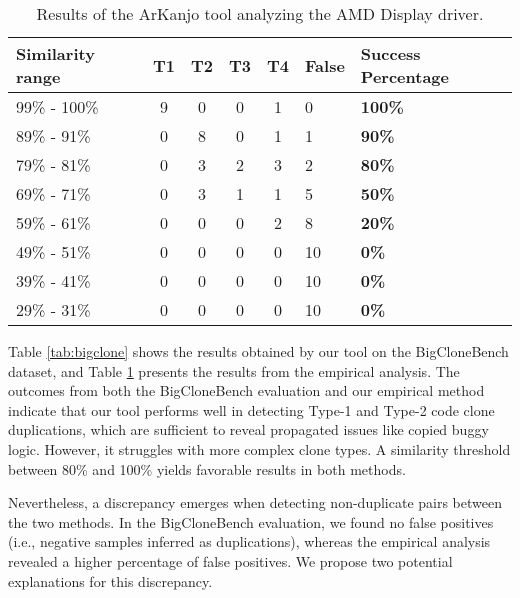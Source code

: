 \documentclass[conference]{IEEEtran}
\begin{document}
\begin{table}[!t]

\centering
\caption{Results of the ArKanjo tool analyzing the AMD Display driver.}
\begin{tabular}{ | m{15mm} | c | c | c | c | m{6mm} | m{10mm} | }

\hline

\textbf{Similarity range} & \textbf{T1} & \textbf{T2} & T3 & T4
& \textbf{False} & \textbf{Success Percentage} \\ \hline
99\% - 100\% & 9 & 0 & 0 & 1 & 0 & \textbf{100\%} \\ \hline
89\% - 91\% & 0 & 8 & 0 & 1 & 1 & \textbf{90\%} \\ \hline
79\% - 81\% & 0 & 3 & 2 & 3 & 2 & \textbf{80\%} \\ \hline
69\% - 71\% & 0 & 3 & 1 & 1 & 5 & \textbf{50\%} \\ \hline
59\% - 61\% & 0 & 0 & 0 & 2 & 8 & \textbf{20\%} \\ \hline
49\% - 51\% & 0 & 0 & 0 & 0 & 10 & \textbf{0\%} \\ \hline
39\% - 41\% & 0 & 0 & 0 & 0 & 10 & \textbf{0\%} \\ \hline
29\% - 31\% & 0 & 0 & 0 & 0 & 10 & \textbf{0\%} \\ \hline

\hline

\end{tabular}

\label{tab:emp}

\end{table}

Table \ref{tab:bigclone} shows the results obtained by our tool on the BigCloneBench dataset,
and Table \ref{tab:emp} presents the results from the empirical analysis.
The outcomes from both the BigCloneBench evaluation and our empirical method indicate that
our tool performs well in detecting Type-1 and Type-2 code clone duplications,
which are sufficient to reveal propagated issues like copied buggy logic.
However, it struggles with more complex clone types. A similarity threshold between 80\% and 100\% 
yields favorable results in both methods.

Nevertheless, a discrepancy emerges when detecting non-duplicate pairs between
the two methods. In the BigCloneBench evaluation, we found no false positives (i.e., negative
samples inferred as duplications), whereas the empirical analysis revealed a higher percentage
of false positives. We propose two potential explanations for this discrepancy.
\end{document}
